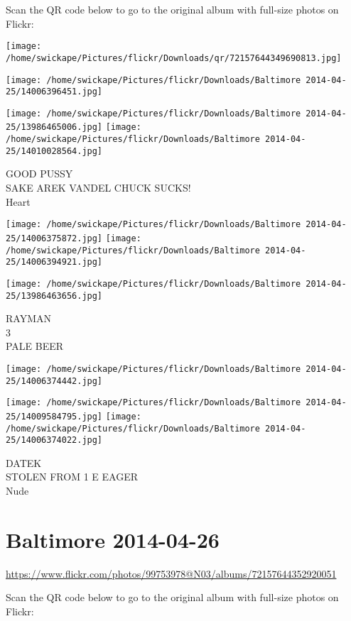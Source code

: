 \documentclass[10pt,letterpaper]{article}
\begin{document}
Scan the QR code below to go to the original album with full-size photos on Flickr:

\texttt{[image: /home/swickape/Pictures/flickr/Downloads/qr/72157644349690813.jpg]}
\pagebreak

\texttt{[image: /home/swickape/Pictures/flickr/Downloads/Baltimore 2014-04-25/14006396451.jpg]}

\vspace{0.25in}
\texttt{[image: /home/swickape/Pictures/flickr/Downloads/Baltimore 2014-04-25/13986465006.jpg]}
\texttt{[image: /home/swickape/Pictures/flickr/Downloads/Baltimore 2014-04-25/14010028564.jpg]}

GOOD PUSSY\\
SAKE AREK VANDEL CHUCK SUCKS!\\
Heart
\pagebreak

\texttt{[image: /home/swickape/Pictures/flickr/Downloads/Baltimore 2014-04-25/14006375872.jpg]}
\texttt{[image: /home/swickape/Pictures/flickr/Downloads/Baltimore 2014-04-25/14006394921.jpg]}

\vspace{0.25in}
\texttt{[image: /home/swickape/Pictures/flickr/Downloads/Baltimore 2014-04-25/13986463656.jpg]}

RAYMAN\\
3\\
PALE BEER
\pagebreak

\texttt{[image: /home/swickape/Pictures/flickr/Downloads/Baltimore 2014-04-25/14006374442.jpg]}

\vspace{0.25in}
\texttt{[image: /home/swickape/Pictures/flickr/Downloads/Baltimore 2014-04-25/14009584795.jpg]}
\texttt{[image: /home/swickape/Pictures/flickr/Downloads/Baltimore 2014-04-25/14006374022.jpg]}

DATEK\\
STOLEN FROM 1 E EAGER\\
Nude
\pagebreak

\section*{Baltimore 2014-04-26}

\url{https://www.flickr.com/photos/99753978@N03/albums/72157644352920051}

Scan the QR code below to go to the original album with full-size photos on Flickr:
\end{document}
